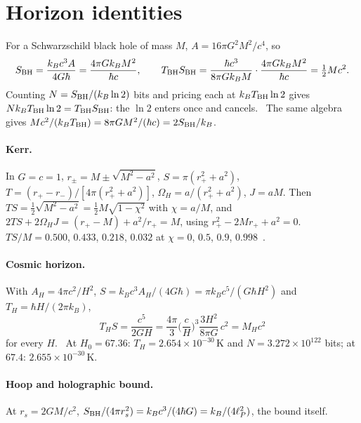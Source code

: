 \section{Horizon identities}\label{app:der:horizons}
For a Schwarzschild black hole of mass $M$, $A=16\pi G^2M^2/c^4$, so
\begin{equation}
S_{\rm BH}=\frac{k_Bc^3A}{4G\hbar}=\frac{4\pi Gk_BM^2}{\hbar c},\qquad
T_{\rm BH}S_{\rm BH}=\frac{\hbar c^3}{8\pi Gk_BM}\cdot\frac{4\pi Gk_BM^2}{\hbar c}=\tfrac12Mc^2 .
\end{equation}
Counting $N=S_{\rm BH}/(k_B\ln2)$ bits and pricing each at $k_BT_{\rm BH}\ln2$ gives $Nk_BT_{\rm BH}\ln2=T_{\rm BH}S_{\rm BH}$: the $\ln2$ enters once
and cancels. \derived\ The same algebra gives $Mc^2/(k_BT_{\rm BH})=8\pi GM^2/(\hbar c)=2S_{\rm BH}/k_B$.

\paragraph{Kerr.} In $G=c=1$, $r_\pm=M\pm\sqrt{M^2-a^2}$, $S=\pi(r_+^2+a^2)$, $T=(r_+-r_-)/[4\pi(r_+^2+a^2)]$, $\Omega_H=a/(r_+^2+a^2)$, $J=aM$. Then
$TS=\tfrac12\sqrt{M^2-a^2}=\tfrac12M\sqrt{1-\chi^2}$ with $\chi=a/M$, and $2TS+2\Omega_HJ=(r_+-M)+a^2/r_+=M$, using $r_+^2-2Mr_++a^2=0$.
$TS/M=0.500$, $0.433$, $0.218$, $0.032$ at $\chi=0$, $0.5$, $0.9$, $0.998$~\cite{Kerr1963,Smarr1973}. \derived

\paragraph{Cosmic horizon.} With $A_H=4\pi c^2/H^2$, $S=k_Bc^3A_H/(4G\hbar)=\pi k_Bc^5/(G\hbar H^2)$ and $T_H=\hbar H/(2\pi k_B)$,
\begin{equation}
T_HS=\frac{c^5}{2GH}=\frac{4\pi}{3}\Big(\frac cH\Big)^3\frac{3H^2}{8\pi G}\,c^2=M_Hc^2
\end{equation}
for every $H$. \derived\ At $H_0=67.36$: $T_H=2.654\times10^{-30}$\,K and $N=3.272\times10^{122}$ bits; at $67.4$: $2.655\times10^{-30}$\,K. \calc

\paragraph{Hoop and holographic bound.} At $r_s=2GM/c^2$, $S_{\rm BH}/(4\pi r_s^2)=k_Bc^3/(4\hbar G)=k_B/(4\ell_P^2)$, the bound itself. \derived

